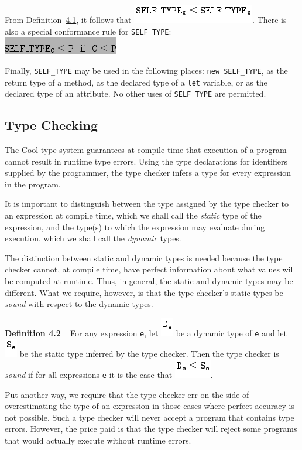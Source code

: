 \documentclass[]{article}
\begin{document}
From Definition~\href{node7.html\#def-conforms}{4.1}, it follows that
\includegraphics{img11.png}. There is also a special conformance rule
for \texttt{SELF\_TYPE}: \\

\includegraphics{img12.png}

Finally, \texttt{SELF\_TYPE} may be used in the following places:
\texttt{new SELF\_TYPE}, as the return type of a method, as the declared
type of a \texttt{let} variable, or as the declared type of an
attribute. No other uses of \texttt{SELF\_TYPE} are permitted.

\subsection{Type Checking}

The Cool type system guarantees at compile time that execution of a
program cannot result in runtime type errors. Using the type
declarations for identifiers supplied by the programmer, the type
checker infers a type for every expression in the program.

It is important to distinguish between the type assigned by the type
checker to an expression at compile time, which we shall call the
\emph{static} type of the expression, and the type(s) to which the
expression may evaluate during execution, which we shall call the
\emph{dynamic} types.

The distinction between static and dynamic types is needed because the
type checker cannot, at compile time, have perfect information about
what values will be computed at runtime. Thus, in general, the static
and dynamic types may be different. What we require, however, is that
the type checker's static types be \emph{sound} with respect to the
dynamic types.

\textbf{Definition 4.2} ~ For any expression \texttt{e}, let
\includegraphics{img13.png} be a dynamic type of \texttt{e} and let
\includegraphics{img14.png} be the static type inferred by the type
checker. Then the type checker is \emph{sound} if for all expressions
\texttt{e} it is the case that \includegraphics{img15.png}.

Put another way, we require that the type checker err on the side of
overestimating the type of an expression in those cases where perfect
accuracy is not possible. Such a type checker will never accept a
program that contains type errors. However, the price paid is that the
type checker will reject some programs that would actually execute
without runtime errors.
\end{document}
